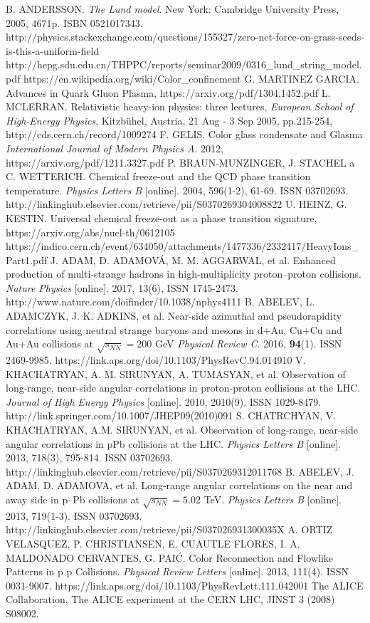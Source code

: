 \documentclass[thesismargins, thesislinespacing]{rnthesis}
\begin{document}
\begin{thebibliography}{}
B. ANDERSSON. \textit{The Lund model}. New York: Cambridge University Press, 2005, 4671p. ISBN 0521017343.
http://physics.stackexchange.com/questions/155327/zero-net-force-on-grass-seeds-is-this-a-uniform-field
http://hepg.sdu.edu.cn/THPPC/reports/seminar2009/0316\_lund\_string\_model.pdf
https://en.wikipedia.org/wiki/Color\_confinement
G. MARTINEZ GARCIA. Advances in Quark Gluon Plasma, https://arxiv.org/pdf/1304.1452.pdf
L. MCLERRAN. Relativistic heavy-ion physics: three lectures, \textit{European School of High-Energy Physics}, Kitzbühel, Austria, 21 Aug - 3 Sep 2005, pp.215-254, http://cds.cern.ch/record/1009274
F. GELIS. Color glass condensate and Glasma \textit{International Journal of Modern Physics A}. 2012, https://arxiv.org/pdf/1211.3327.pdf
P. BRAUN-MUNZINGER, J. STACHEL a C. WETTERICH. Chemical freeze-out and the QCD phase transition temperature. \textit{Physics Letters B }[online]. 2004, 596(1-2), 61-69. ISSN 03702693. http://linkinghub.elsevier.com/retrieve/pii/S0370269304008822
U. HEINZ, G. KESTIN. Universal chemical freeze-out as a phase transition signature, https://arxiv.org/abs/nucl-th/0612105
https://indico.cern.ch/event/634050/attachments/1477336/2332417/HeavyIons\_Part1.pdf
 J. ADAM, D. ADAMOVÁ, M. M. AGGARWAL, et al. Enhanced production of multi-strange hadrons in high-multiplicity proton–proton collisions. \textit{Nature Physics }[online]. 2017, 13(6), ISSN 1745-2473. http://www.nature.com/doifinder/10.1038/nphys4111
B. ABELEV, L. ADAMCZYK, J. K. ADKINS, et al. Near-side azimuthal and pseudorapidity correlations using neutral strange baryons and mesons in d+Au, Cu+Cu and Au+Au collisions at $\sqrt{s_{NN}}=200$ GeV \textit{Physical Review C}. 2016, \textbf{94}(1). ISSN 2469-9985. https://link.aps.org/doi/10.1103/PhysRevC.94.014910
V. KHACHATRYAN, A. M. SIRUNYAN, A. TUMASYAN, et al. Observation of long-range, near-side angular correlations in proton-proton collisions at the LHC. \textit{Journal of High Energy Physics} [online]. 2010, 2010(9). ISSN 1029-8479. http://link.springer.com/10.1007/JHEP09(2010)091
S. CHATRCHYAN, V. KHACHATRYAN, A.M. SIRUNYAN, et al. Observation of long-range, near-side angular correlations in pPb collisions at the LHC. \textit{Physics Letters B} [online]. 2013, 718(3), 795-814. ISSN 03702693. http://linkinghub.elsevier.com/retrieve/pii/S0370269312011768
B. ABELEV, J. ADAM, D. ADAMOVA, et al. Long-range angular correlations on the near and away side in p–Pb collisions at $\sqrt{s_{NN}}=5.02$ TeV. \textit{Physics Letters B} [online]. 2013, 719(1-3). ISSN 03702693. http://linkinghub.elsevier.com/retrieve/pii/S037026931300035X
A. ORTIZ VELASQUEZ, P. CHRISTIANSEN, E. CUAUTLE FLORES, I. A. MALDONADO CERVANTES, G. PAIĆ. Color Reconnection and Flowlike Patterns in p p Collisions. \textit{Physical Review Letters} [online]. 2013, 111(4). ISSN 0031-9007. https://link.aps.org/doi/10.1103/PhysRevLett.111.042001
The ALICE Collaboration, The ALICE experiment at the CERN LHC, JINST 3 (2008) S08002.


\end{thebibliography}
\end{document}
